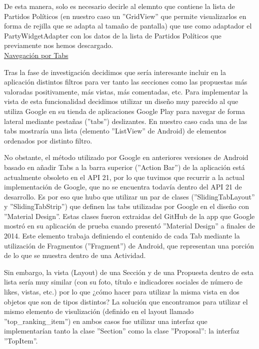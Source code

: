 		De esta manera, solo es necesario decirle al elemnto que contiene la lista de Partidos Políticos (en nuestro caso un ''GridView'' que permite visualizarlos en forma de rejilla que se adapta al tamaño de pantalla) que use como adaptador el PartyWidgetAdapter con los datos de la lista de Partidos Políticos que previamente nos hemos descargado. \\
		
				
		\underline{Navegación por Tabs}
		
		Tras la fase de investigación decidimos que sería interesante incluir en la aplicación distintos filtros para ver tanto las secciones como las propuestas más valoradas positivamente, más vistas, más comentadas, etc. Para implementar la vista de esta funcionalidad decidimos utilizar un diseño muy parecido al que utiliza Google en su tienda de aplicaciones Google Play para navegar de forma lateral mediante pestañas (''tabs'') deslizantes. En nuestro caso cada una de las tabs mostraría una lista (elemento ''ListView'' de Android) de elementos ordenados por distinto filtro.
		
		No obstante, el método utilizado por Google en anteriores versiones de Android basado en añadir Tabs a la barra superior (''Action Bar'')\cite{ref:android_actionBar} de la aplicación está actualmente obsoleto en el API 21, por lo que tuvimos que recurrir a la actual implementación de Google, que no se encuentra todavía dentro del API 21 de desarrollo. Es por eso que hubo que utilizar un par de clases (''SlidingTabLayout'' y ''SlidingTabStrip'') que definen las tabs utilizadas por Google en el diseño con ''Material Design''. Estas clases fueron extraidas del GitHub\cite{ref:android_tabGoogle} de la app que Google mostró en su aplicación de prueba cuando presentó ''Material Design'' a finales de 2014. Este elemento trabaja definiendo el contenido de cada Tab mediante la utilización de Fragmentos\cite{ref:android_fragment} (''Fragment'') de Android, que representan una porción de lo que se muestra dentro de una Actividad.
		
		Sin embargo, la vista (Layout) de una Sección y de una Propuesta dentro de esta lista sería muy similar (con su foto, título e indicadores sociales de número de likes, vistas, etc.) por lo que ¿cómo hacer para utilizar la misma vista en dos objetos que son de tipos distintos? La solución que encontramos para utilizar el mismo elemento de visulización (definido en el layout llamado ''top\_ranking\_item'') en ambos casos fue utilizar una interfaz que implementarían tanto la clase  ''Section'' como la clase ''Proposal'': la interfaz ''TopItem''.
		
